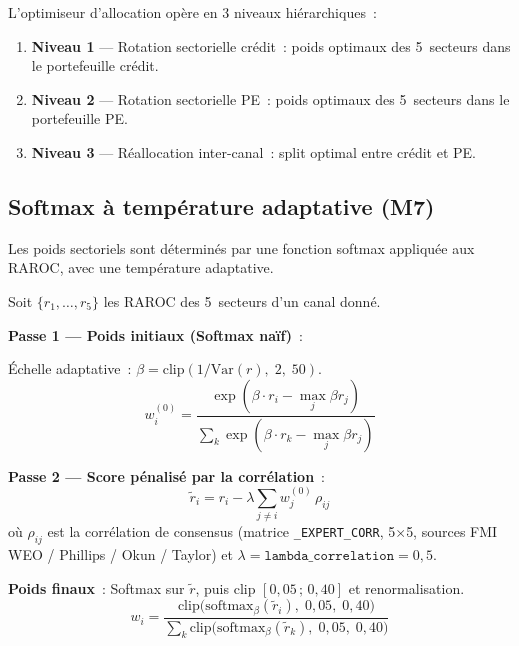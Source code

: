 \documentclass[12pt,a4paper]{article}
\begin{document}
L'optimiseur d'allocation op\`ere en 3 niveaux hi\'erarchiques~:

\begin{enumerate}
    \item \textbf{Niveau 1} --- Rotation sectorielle cr\'edit~: poids optimaux des 5~secteurs dans le portefeuille cr\'edit.
    \item \textbf{Niveau 2} --- Rotation sectorielle PE~: poids optimaux des 5~secteurs dans le portefeuille PE.
    \item \textbf{Niveau 3} --- R\'eallocation inter-canal~: split optimal entre cr\'edit et PE.
\end{enumerate}

\subsection{Softmax \`a temp\'erature adaptative (M7)}

Les poids sectoriels sont d\'etermin\'es par une fonction softmax appliqu\'ee aux RAROC, avec une temp\'erature adaptative.

\begin{formulebox}
Soit $\{r_1, \ldots, r_5\}$ les RAROC des 5~secteurs d'un canal donn\'e.

\textbf{Passe 1 --- Poids initiaux (Softmax na\"if)}~:

\'Echelle adaptative~: $\beta = \text{clip}(1/\text{Var}(r),\; 2,\; 50)$.
\begin{equation}
    w_i^{(0)} = \frac{\exp(\beta \cdot r_i - \max_j \beta r_j)}{\sum_k \exp(\beta \cdot r_k - \max_j \beta r_j)}
    \label{eq:softmax_raw}
\end{equation}

\textbf{Passe 2 --- Score p\'enalis\'e par la corr\'elation}~:
\begin{equation}
    \tilde{r}_i = r_i - \lambda \sum_{j \neq i} w_j^{(0)} \, \rho_{ij}
    \label{eq:corr_penalty}
\end{equation}
o\`u $\rho_{ij}$ est la corr\'elation de consensus (matrice \texttt{\_EXPERT\_CORR}, 5$\times$5, sources FMI WEO / Phillips / Okun / Taylor) et $\lambda = \texttt{lambda\_correlation} = 0{,}5$.

\textbf{Poids finaux}~: Softmax sur $\tilde{r}$, puis clip $[0{,}05\,;\, 0{,}40]$ et renormalisation.
\begin{equation}
    w_i = \frac{\text{clip}\!\bigl(\text{softmax}_\beta(\tilde{r}_i),\; 0{,}05,\; 0{,}40\bigr)}{\sum_k \text{clip}\!\bigl(\text{softmax}_\beta(\tilde{r}_k),\; 0{,}05,\; 0{,}40\bigr)}
    \label{eq:softmax_clipped}
\end{equation}
\end{formulebox}
\end{document}
